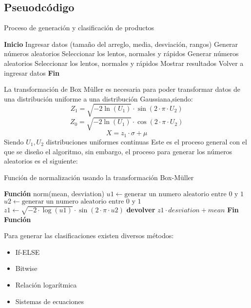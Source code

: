 \documentclass{article}
\begin{document}
    \subsection{Pseuodcódigo}
    \begin{algorithm}
        \caption{Proceso de generación y clasificación de productos}
        \begin{algorithmic}
        \STATE \textbf{Inicio}
        \STATE Ingresar datos (tamaño del arreglo, media, desviación, rangos)
            \STATE Generar números aleatorios
            \STATE Seleccionar los lentos, normales y rápidos
                \STATE Generar números aleatorios
                \STATE Seleccionar los lentos, normales y rápidos
            \ENDFOR
            \STATE Mostrar resultados
        \ELSE
            \STATE Volver a ingresar datos
        \ENDIF
        \STATE \textbf{Fin}
        \end{algorithmic}
    \end{algorithm}
La transformación de Box Müller es necesaria para poder transformar datos de una distribución uniforme a una distribución Gaussiana,siendo: 
$$Z_1=\sqrt{-2\ln(U_1)} \cdot \sin(2\cdot \pi \cdot U_2)$$
$$Z_0=\sqrt{-2\ln(U_1)} \cdot \cos(2\cdot \pi \cdot U_2)$$
$$X= z_1 \cdot \sigma+\mu$$
Siendo $U_1,U_2$ distribuciones uniformes continuas
Este es el proceso general con el que se diseño el algoritmo, sin embargo, el proceso para generar los números aleatorios es el siguiente:
\begin{algorithm}
    \caption{Función de normalización usando la transformación Box-Müller}
    \begin{algorithmic}[1] %
        \STATE \textbf{Función} norm(mean, desviation)
        \STATE \(u1 \gets \text{generar un numero aleatorio entre 0 y 1}\)
        \STATE \(u2 \gets \text{generar un numero aleatorio entre 0 y 1}\)
        \STATE \(z1 \gets \sqrt{-2 \cdot \log(u1)} \cdot \sin(2 \cdot \pi \cdot u2)\)
        \STATE \textbf{devolver} $z1 \cdot desviation + mean$
        \STATE \textbf{Fin Función}
    \end{algorithmic}
\end{algorithm}

Para generar las clasificaciones existen diversos métodos:
\begin{itemize}
    \item If-ELSE
    \item Bitwise
    \item Relación logarítmica
    \item Sistemas de ecuaciones 
\end{itemize}
\end{document}
